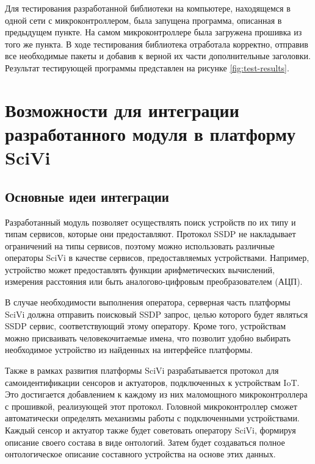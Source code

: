 Для тестирования разработанной библиотеки на компьютере, находящемся в одной сети с микроконтроллером, была запущена программа, описанная в предыдущем пункте.
На самом микроконтроллере была загружена прошивка из того же пункта.
В ходе тестирования библиотека отработала корректно, отправив все необходимые пакеты и добавив к верной их части дополнительные заголовки.
Результат тестирующей программы представлен на рисунке \ref{fig:test-results}.



\section{Возможности для интеграции разработанного модуля в платформу SciVi}

\subsection{Основные идеи интеграции}

Разработанный модуль позволяет осуществлять поиск устройств по их типу и типам сервисов, которые они предоставляют.
Протокол SSDP не накладывает ограничений на типы сервисов, поэтому можно использовать различные операторы SciVi в качестве сервисов, предоставляемых устройствами.
Например, устройство может предоставлять функции арифметических вычислений, измерения расстояния или быть аналогово-цифровым преобразователем (АЦП).

В случае необходимости выполнения оператора, серверная часть платформы SciVi должна отправить поисковый SSDP запрос, целью которого будет являться SSDP сервис, соответствующий этому оператору.
Кроме того, устройствам можно присваивать человекочитаемые имена, что позволит удобно выбирать необходимое устройство из найденных на интерфейсе платформы.

Также в рамках развития платформы SciVi разрабатывается протокол для самоидентификации сенсоров и актуаторов, подключенных к устройствам IoT.
Это достигается добавлением к каждому из них маломощного микроконтроллера с прошивкой, реализующей этот протокол.
Головной микроконтроллер сможет автоматически определять механизмы работы с подключенными устройствами.
Каждый сенсор и актуатор также будет советовать оператору SciVi, формируя описание своего состава в виде онтологий.
Затем будет создаваться полное онтологическое описание составного устройства на основе этих данных.

